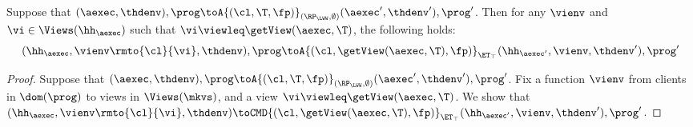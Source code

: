 \begin{proposition}
\label{prop:aexec2kv_transition}
Suppose that $(\aexec, \thdenv), \prog \toA{(\cl, \T, \fp)}_{(\RP_{\LWW}, \emptyset)} (\aexec', \thdenv'), \prog'$. 
Then for any $\vienv$ and $\vi \in \Views(\hh_{\aexec})$ such that $\vi \viewleq \getView(\aexec, \T)$, 
the following holds:
\[
    (\hh_{\aexec}, \vienv\rmto{\cl}{\vi}, \thdenv), \prog 
    \toA{(\cl, \getView(\aexec, \T), \fp)}_{\ET_{\top}} (\hh_{\aexec'}, \vienv, \thdenv'), \prog'
\]
\end{proposition}
\begin{proof}
Suppose that $(\aexec, \thdenv), \prog \toA{(\cl, \T, \fp)}_{(\RP_{\LWW}, \emptyset)} (\aexec', \thdenv'), \prog'$. 
Fix a function $\vienv$ from clients in $\dom(\prog)$ to views in $\Views(\mkvs)$, and a view $\vi \viewleq \getView(\aexec, \T)$.
We show that 
$(\hh_{\aexec}, \vienv\rmto{\cl}{\vi}, \thdenv) \toCMD{(\cl, \getView(\aexec, \T), \fp)}_{\ET_{\top}} (\hh_{\aexec'}, 
\vienv, \thdenv'), \prog'$. 


\end{proof}
